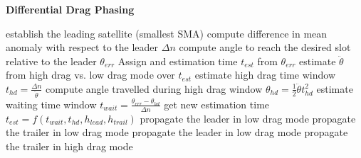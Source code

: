 \begin{algorithm}[h]
      \caption{\textbf{Differential Drag Phasing}}
      \begin{algorithmic}[1]
                  \State establish the leading satellite (smallest SMA)
                              \State compute difference in mean anomaly with respect to the leader $\Delta n$
                              \State compute angle to reach the desired slot relative to the leader $\theta_{err}$
                              \State Assign and estimation time $t_{est}$ from $\theta_{err}$
                              \State estimate $\ddot{\theta}$ from high drag vs. low drag mode over $t_{est}$
                              \State estimate high drag time window $t_{hd} = \frac{\Delta n}{\ddot{\theta}}$
                              \State compute angle travelled during high drag window $\theta_{hd} = \frac{1}{2}\ddot{\theta}t_{hd}^2$
                              \State estimate waiting time window $t_{wait} = \frac{\theta_{err} - \theta_{hd}}{\Delta n}$
                              \State get new estimation time $t_{est} = f(t_{wait}, t_{hd}, h_{lead}, h_{trail})$ 
                        \EndFor
                              \State propagate the leader in low drag mode
                              \State propagate the trailer in low drag mode
                        \EndFor
                              \State propagate the leader in low drag mode
                              \State propagate the trailer in high drag mode
                        \EndFor
                  \EndFor
            \EndProcedure
      \end{algorithmic}
\end{algorithm}


